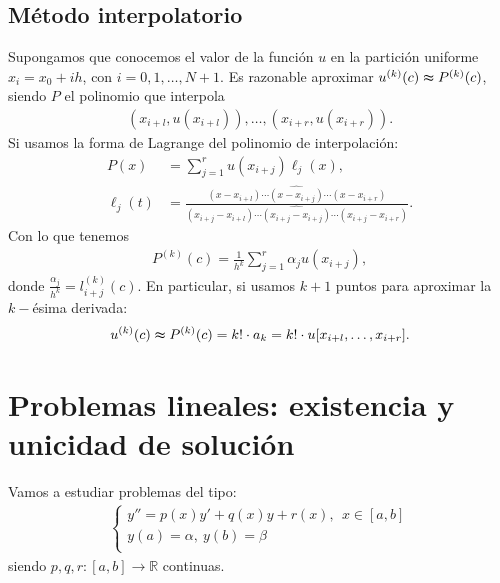 \subsection{Método interpolatorio}
Supongamos que conocemos el valor de la función $u$ en la partición uniforme $x_i = x_0 +ih$, con $i = 0,1,\ldots,N+1$. Es razonable aproximar  $u^{(k)}(c) \thickapprox P^{(k)}(c)$, siendo $P$ el polinomio que interpola
\begin{align*}
    (x_{i+l}, u(x_{i+l})), \ldots, (x_{i+r},u(x_{i+r})).
\end{align*}
Si usamos la forma de Lagrange del polinomio de interpolación:
\begin{align*}
    P(x)      & = \sum_{j=1}^{r} u(x_{i+j})\ell_j(x),                                                                                                                       \\
    \ell_j(t) & = \frac{(x-x_{i+l}) \cdots \widehat{(x - x_{i+j})} \cdots (x-x_{i+r})}{(x_{i+j} -x_{i+l}) \cdots \widehat{(x_{i+j} - x_{i+j})} \cdots (x_{i+j} - x_{i+r})}.
\end{align*}
Con lo que tenemos
\begin{align*}
    P^{(k)}(c) = \frac{1}{h^k} \sum_{j=1}^{r} \alpha_j u(x_{i+j}),
\end{align*}
donde $\frac{\alpha_j}{h^k} = l^{(k)}_{i+j}(c)$. En particular, si usamos $k+1$ puntos para aproximar la $k-$ésima derivada:
\begin{align*}
    u^{(k)}(c) \thickapprox P^{(k)}(c) = k! \cdot a_k = k! \cdot u[x_{i+l},\ldots,x_{i+r}].
\end{align*}

\section{Problemas lineales: existencia y unicidad de solución}
Vamos a estudiar problemas del tipo:
\begin{align*}
    \left\{ \begin{array}{lcc}
                y'' = p(x)y' + q(x)y + r(x), \ \ x \in [a,b] \\
                y(a) = \alpha, \ y(b) = \beta                \\
            \end{array}
    \right.
\end{align*}
siendo $p,q,r :[a,b] \longrightarrow \mathbb{R}$ continuas.

